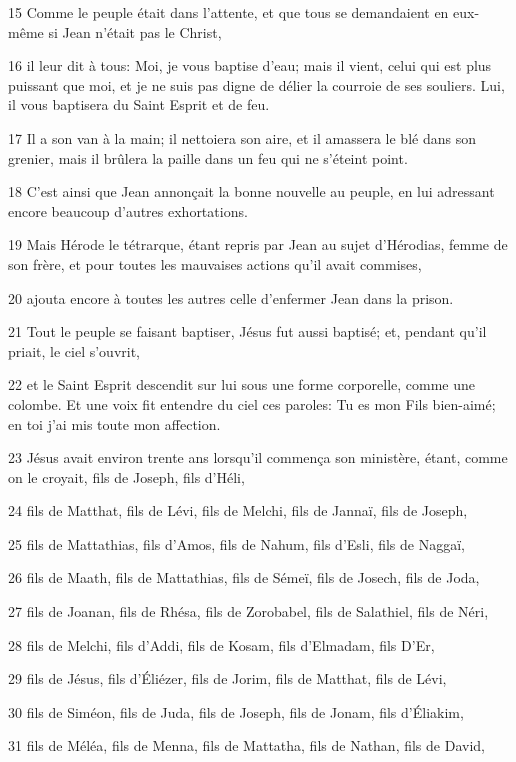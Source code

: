 \par 15 Comme le peuple était dans l'attente, et que tous se demandaient en eux-même si Jean n'était pas le Christ,
\par 16 il leur dit à tous: Moi, je vous baptise d'eau; mais il vient, celui qui est plus puissant que moi, et je ne suis pas digne de délier la courroie de ses souliers. Lui, il vous baptisera du Saint Esprit et de feu.
\par 17 Il a son van à la main; il nettoiera son aire, et il amassera le blé dans son grenier, mais il brûlera la paille dans un feu qui ne s'éteint point.
\par 18 C'est ainsi que Jean annonçait la bonne nouvelle au peuple, en lui adressant encore beaucoup d'autres exhortations.
\par 19 Mais Hérode le tétrarque, étant repris par Jean au sujet d'Hérodias, femme de son frère, et pour toutes les mauvaises actions qu'il avait commises,
\par 20 ajouta encore à toutes les autres celle d'enfermer Jean dans la prison.
\par 21 Tout le peuple se faisant baptiser, Jésus fut aussi baptisé; et, pendant qu'il priait, le ciel s'ouvrit,
\par 22 et le Saint Esprit descendit sur lui sous une forme corporelle, comme une colombe. Et une voix fit entendre du ciel ces paroles: Tu es mon Fils bien-aimé; en toi j'ai mis toute mon affection.
\par 23 Jésus avait environ trente ans lorsqu'il commença son ministère, étant, comme on le croyait, fils de Joseph, fils d'Héli,
\par 24 fils de Matthat, fils de Lévi, fils de Melchi, fils de Jannaï, fils de Joseph,
\par 25 fils de Mattathias, fils d'Amos, fils de Nahum, fils d'Esli, fils de Naggaï,
\par 26 fils de Maath, fils de Mattathias, fils de Sémeï, fils de Josech, fils de Joda,
\par 27 fils de Joanan, fils de Rhésa, fils de Zorobabel, fils de Salathiel, fils de Néri,
\par 28 fils de Melchi, fils d'Addi, fils de Kosam, fils d'Elmadam, fils D'Er,
\par 29 fils de Jésus, fils d'Éliézer, fils de Jorim, fils de Matthat, fils de Lévi,
\par 30 fils de Siméon, fils de Juda, fils de Joseph, fils de Jonam, fils d'Éliakim,
\par 31 fils de Méléa, fils de Menna, fils de Mattatha, fils de Nathan, fils de David,
